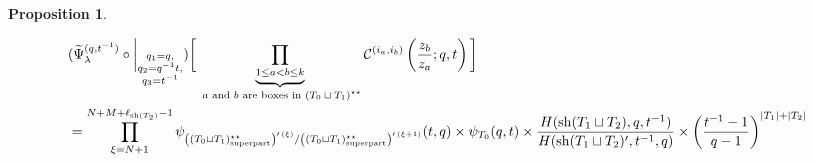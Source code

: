 \documentclass[12pt,reqno,a4paper]{amsart}
\newcommand{\comp}{\circ}
\newcommand{\cals}[1]{\mathcal{#1}}
\numberwithin{equation}{section}
\newtheorem{prop}[thm]{Proposition}
\theoremstyle{definition}
\begin{document}

\begin{prop}\mbox{}
\label{prp49-1703-25jul}

\footnotesize
\begin{align}
	&(
	\widetilde{\Psi}_{\lambda}^{(q,t^{-1})}
	\comp 
	\bigg|_{
		\substack{
			q_1 = q, \\
			q_2 = q^{-1}t,\\
			q_3 = t^{-1} \\
		}
	}
	)
	\bigg[
	\underbrace{	\prod_{1 \leq a < b \leq k}				}_{\text{ $a$ and $b$ are boxes in $(T_0 \sqcup T_1)^{\star\star}$}}
	\cals{C}^{(i_a,i_b)}\left(
	\frac{z_b}{z_a}
	; q, t
	\right)
	\bigg]
	\\
	&= 
	\prod_{\xi = N + 1}^{N + M + \ell_{\operatorname{sh}(T_2)} - 1}
	\psi_{\left(	(T_0 \sqcup T_1)^{\star\star}_{\operatorname{super part}}			\right)^{\prime \, (\xi)}/\left(	(T_0 \sqcup T_1)^{\star\star}_{\operatorname{super part}}			\right)^{\prime \, (\xi + 1)}}(t,q)
	\times 
	\psi_{
		T_0
	}(q,t)
	\times 
	\frac{
		H(\operatorname{sh}(T_1 \sqcup T_2),q,t^{-1})
	}{
		H(\operatorname{sh}(T_1 \sqcup T_2)^\prime,t^{-1},q)
	}
	\times 
	\left(
	\frac{t^{-1} - 1}{q - 1}
	\right)^{
		|T_1| + |T_2|
	}
	\notag 
\end{align}
\normalsize
\end{prop}
\end{document}
